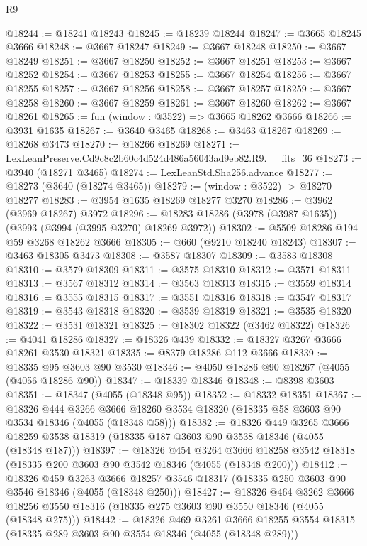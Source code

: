 \begin{lexlean}{R9}
\begin{coremodule}
@18244 := @18241 @18243
@18245 := @18239 @18244
@18247 := @3665 @18245 @3666
@18248 := @3667 @18247
@18249 := @3667 @18248
@18250 := @3667 @18249
@18251 := @3667 @18250
@18252 := @3667 @18251
@18253 := @3667 @18252
@18254 := @3667 @18253
@18255 := @3667 @18254
@18256 := @3667 @18255
@18257 := @3667 @18256
@18258 := @3667 @18257
@18259 := @3667 @18258
@18260 := @3667 @18259
@18261 := @3667 @18260
@18262 := @3667 @18261
@18265 := fun (window : @3522) => @3665 @18262 @3666
@18266 := @3931 @1635
@18267 := @3640 @3465
@18268 := @3463 @18267
@18269 := @18268 @3473
@18270 := @18266 @18269
@18271 := LexLeanPreserve.Cd9c8c2b60c4d524d486a56043ad9eb82.R9.__fits_36
@18273 := @3940 (@18271 @3465)
@18274 := LexLeanStd.Sha256.advance
@18277 := @18273 (@3640 (@18274 @3465))
@18279 := (window : @3522) -> @18270 @18277
@18283 := @3954 @1635 @18269 @18277 @3270
@18286 := @3962 (@3969 @18267) @3972
@18296 := @18283 @18286 (@3978 (@3987 @1635)) (@3993 (@3994 (@3995 @3270) @18269 @3972))
@18302 := @5509 @18286 @194 @59 @3268 @18262 @3666
@18305 := @660 (@9210 @18240 @18243)
@18307 := @3463 @18305 @3473
@18308 := @3587 @18307
@18309 := @3583 @18308
@18310 := @3579 @18309
@18311 := @3575 @18310
@18312 := @3571 @18311
@18313 := @3567 @18312
@18314 := @3563 @18313
@18315 := @3559 @18314
@18316 := @3555 @18315
@18317 := @3551 @18316
@18318 := @3547 @18317
@18319 := @3543 @18318
@18320 := @3539 @18319
@18321 := @3535 @18320
@18322 := @3531 @18321
@18325 := @18302 @18322 (@3462 @18322)
@18326 := @4041 @18286
@18327 := @18326 @439
@18332 := @18327 @3267 @3666 @18261 @3530 @18321
@18335 := @8379 @18286 @112 @3666
@18339 := @18335 @95 @3603 @90 @3530
@18346 := @4050 @18286 @90 @18267 (@4055 (@4056 @18286 @90))
@18347 := @18339 @18346
@18348 := @8398 @3603
@18351 := @18347 (@4055 (@18348 @95))
@18352 := @18332 @18351
@18367 := @18326
    @444
    @3266
    @3666
    @18260
    @3534
    @18320
    (@18335 @58 @3603 @90 @3534 @18346 (@4055 (@18348 @58)))
@18382 := @18326
    @449
    @3265
    @3666
    @18259
    @3538
    @18319
    (@18335 @187 @3603 @90 @3538 @18346 (@4055 (@18348 @187)))
@18397 := @18326
    @454
    @3264
    @3666
    @18258
    @3542
    @18318
    (@18335 @200 @3603 @90 @3542 @18346 (@4055 (@18348 @200)))
@18412 := @18326
    @459
    @3263
    @3666
    @18257
    @3546
    @18317
    (@18335 @250 @3603 @90 @3546 @18346 (@4055 (@18348 @250)))
@18427 := @18326
    @464
    @3262
    @3666
    @18256
    @3550
    @18316
    (@18335 @275 @3603 @90 @3550 @18346 (@4055 (@18348 @275)))
@18442 := @18326
    @469
    @3261
    @3666
    @18255
    @3554
    @18315
    (@18335 @289 @3603 @90 @3554 @18346 (@4055 (@18348 @289)))

\end{coremodule}
\end{lexlean}
